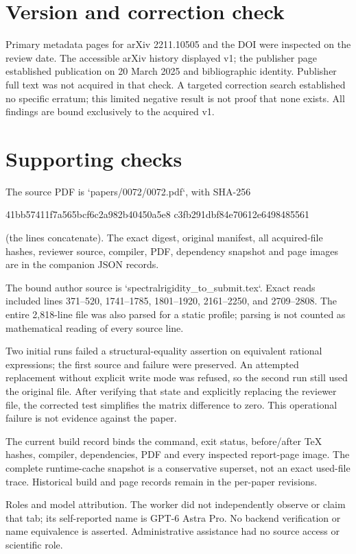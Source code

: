 \documentclass[10pt]{article}
\begin{document}
\section*{Version and correction check}
Primary metadata pages for arXiv 2211.10505 and the DOI were inspected on the review date. The accessible arXiv history displayed v1; the publisher page established publication on 20 March 2025 and bibliographic identity. Publisher full text was not acquired in that check. A targeted correction search established no specific erratum; this limited negative result is not proof that none exists. All findings are bound exclusively to the acquired v1.\par
\section*{Supporting checks}
The source PDF is `papers/0072/0072.pdf`, with SHA-256\par
41bb57411f7a565bcf6c2a982b40450a5e8
c3fb291dbf84e70612e6498485561\par
(the lines concatenate). The exact digest, original manifest, all acquired-file hashes, reviewer source, compiler, PDF, dependency snapshot and page images are in the companion JSON records.\par
The bound author source is `spectralrigidity\_to\_submit.tex`. Exact reads included lines 371–520, 1741–1785, 1801–1920, 2161–2250, and 2709–2808. The entire 2,818-line file was also parsed for a static profile; parsing is not counted as mathematical reading of every source line.\par
Two initial runs failed a structural-equality assertion on equivalent rational expressions; the first source and failure were preserved. An attempted replacement without explicit write mode was refused, so the second run still used the original file. After verifying that state and explicitly replacing the reviewer file, the corrected test simplifies the matrix difference to zero. This operational failure is not evidence against the paper.\par
The current build record binds the command, exit status, before/after TeX hashes, compiler, dependencies, PDF and every inspected report-page image. The complete runtime-cache snapshot is a conservative superset, not an exact used-file trace. Historical build and page records remain in the per-paper revisions.\par
Roles and model attribution. The worker did not independently observe or claim that tab; its self-reported name is GPT-6 Astra Pro. No backend verification or name equivalence is asserted. Administrative assistance had no source access or scientific role.\par
\end{document}
